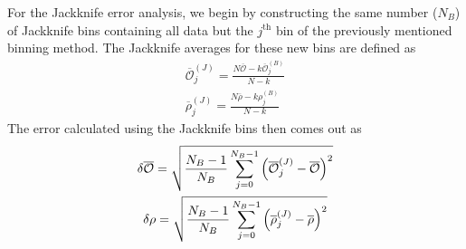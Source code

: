 \documentclass[../journal_main.tex]{subfiles}
\begin{document}
For the Jackknife error analysis, we begin by constructing the same number ($N_B$) of Jackknife bins containing all data but the $j^\text{th}$ bin of the previously mentioned binning method. The Jackknife averages for these new bins are defined as 
\begin{gather*}
    \overline{\mathcal{O}}^{(J)}_j = \frac{N\overline{\mathcal{O}} - k \overline{\mathcal{O}}^{(B)}_j}{N - k} \\
    \overline{\rho }^{(J)}_j = \frac{N\overline{\rho } - k {\rho}^{(B)}_j}{N - k}
\end{gather*}          
The error calculated using the Jackknife bins then comes out as
\begin{subequations}
    \begin{gather}
        \delta \overline{\mathcal{O}} = \sqrt{\frac{N_B-1}{N_B} \sum_{j=0}^{N_B-1}\qty(\overline{\mathcal{O}}^{(J)}_j - \overline{\mathcal{O}})^2} \\
        \delta \rho  = \sqrt{\frac{N_B-1}{N_B} \sum_{j=0}^{N_B-1}\qty(\overline{\rho }^{(J)}_j - \overline{\rho})^2}
    \end{gather}     
    \label{jackknifeerror}
\end{subequations}
\end{document}

